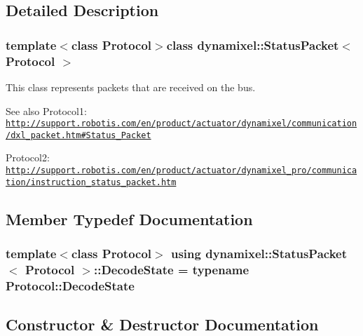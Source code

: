 \subsection{Detailed Description}
\subsubsection*{template$<$class Protocol$>$class dynamixel\+::\+Status\+Packet$<$ Protocol $>$}

This class represents packets that are received on the bus.

\begin{DoxySeeAlso}{See also}
Protocol1\+: \href{http://support.robotis.com/en/product/actuator/dynamixel/communication/dxl_packet.htm#Status_Packet}{\tt http\+://support.\+robotis.\+com/en/product/actuator/dynamixel/communication/dxl\+\_\+packet.\+htm\#\+Status\+\_\+\+Packet} 

Protocol2\+: \href{http://support.robotis.com/en/product/actuator/dynamixel_pro/communication/instruction_status_packet.htm}{\tt http\+://support.\+robotis.\+com/en/product/actuator/dynamixel\+\_\+pro/communication/instruction\+\_\+status\+\_\+packet.\+htm} 
\end{DoxySeeAlso}


\subsection{Member Typedef Documentation}
\hypertarget{classdynamixel_1_1_status_packet_a8503d43f735f141c2faa37aaac8abbc6}{}
\subsubsection[{Decode\+State}]{\setlength{\rightskip}{0pt plus 5cm}template$<$class Protocol$>$ using {\bf dynamixel\+::\+Status\+Packet}$<$ Protocol $>$\+::{\bf Decode\+State} =  typename Protocol\+::\+Decode\+State}\label{classdynamixel_1_1_status_packet_a8503d43f735f141c2faa37aaac8abbc6}


\subsection{Constructor \& Destructor Documentation}
\hypertarget{classdynamixel_1_1_status_packet_a569c906dc127b35054910ee24ac3106d}{}
